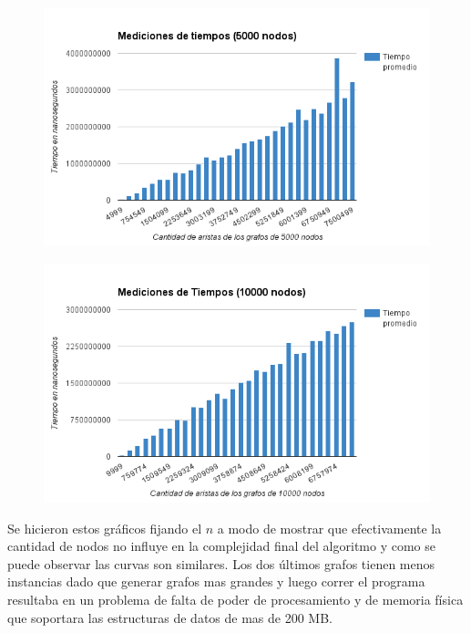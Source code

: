  \begin{figure}[h!]
	\centering
 	\includegraphics[scale=0.8]{imagenes/ej3/tiempos5000.png}
 \end{figure}

 \begin{figure}[h!]
	\centering
 	\includegraphics[scale=0.8]{imagenes/ej3/tiempos10000.png}
 \end{figure}

 Se hicieron estos gráficos fijando el $n$ a modo de mostrar que efectivamente la cantidad de nodos no influye en la complejidad final del algoritmo y como se puede observar las curvas son similares. Los dos últimos grafos tienen menos instancias dado que generar grafos mas grandes y luego correr el programa resultaba en un problema de falta de poder de procesamiento y de memoria física que soportara las estructuras de datos de mas de 200 MB.

